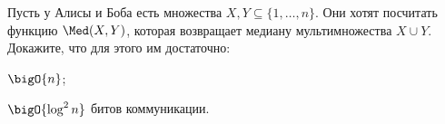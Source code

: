 Пусть у Алисы и Боба есть множества $X, Y \subseteq \{1, \dots, n\}$. Они хотят посчитать функцию $\Med(X, Y)$, которая
возвращает медиану мультимножества $X \cup Y$. Докажите, что для этого им достаточно:
\begin{enumcyr}
    \item $\bigO{n}$;
    \item $\bigO{\log^2 n}$ битов коммуникации.
\end{enumcyr}